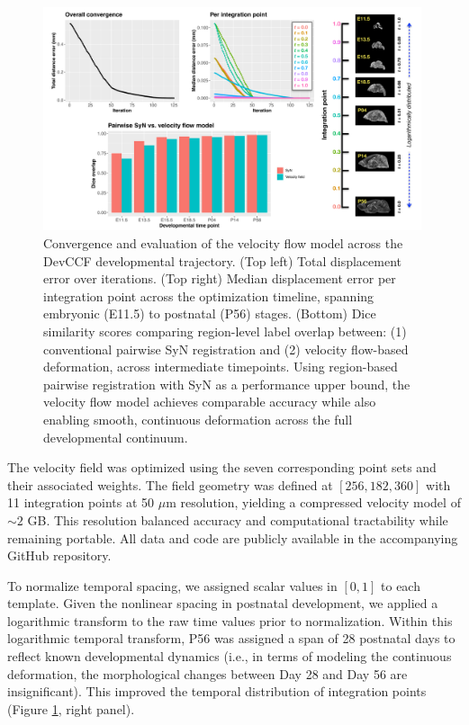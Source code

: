 \documentclass[
  12pt,
]{article}
\begin{document}
\begin{figure}[!htb]
\centering
\includegraphics[width=0.99\textwidth]{Figures/convergence.pdf}
\caption{Convergence and evaluation of the velocity flow model across the
DevCCF developmental trajectory. (Top left) Total displacement error over
iterations. (Top right) Median displacement error per integration point across
the optimization timeline, spanning embryonic (E11.5) to postnatal (P56) stages.
(Bottom) Dice similarity scores comparing region-level label overlap between:
(1) conventional pairwise SyN registration and (2) velocity flow-based
deformation, across intermediate timepoints. Using region-based pairwise
registration with SyN as a performance upper bound, the velocity flow model
achieves comparable accuracy while also enabling smooth, continuous deformation
across the full developmental continuum.}
\label{fig:convergence}
\end{figure}

The velocity field was optimized using the seven corresponding point
sets and their associated weights. The field geometry was defined at
\([256, 182, 360]\) with 11 integration points at 50 \(\mu\)m
resolution, yielding a compressed velocity model of \(\sim2\) GB. This
resolution balanced accuracy and computational tractability while
remaining portable. All data and code are publicly available in the
accompanying GitHub repository.

To normalize temporal spacing, we assigned scalar values in \([0, 1]\)
to each template. Given the nonlinear spacing in postnatal development,
we applied a logarithmic transform to the raw time values prior to
normalization. Within this logarithmic temporal transform, P56 was
assigned a span of 28 postnatal days to reflect known developmental
dynamics (i.e., in terms of modeling the continuous deformation, the
morphological changes between Day 28 and Day 56 are insignificant). This
improved the temporal distribution of integration points (Figure
\ref{fig:convergence}, right panel).
\end{document}
